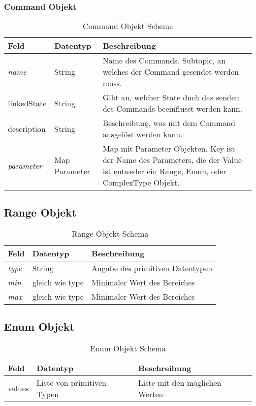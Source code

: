 \subsubsection{Command Objekt}
\begin{table}[H]
\begin{tabularx}{\textwidth}{|l|l|X|}

 \hline \rowcolor{lightgray}
 {\bf Feld } & {\bf Datentyp } & {\bf Beschreibung } \\  \hline
 
 \textit{name}  &   String   &  Name des Commands. Subtopic, an welches der Command gesendet werden muss. \\ \hline
 linkedState  &   String   &  Gibt an, welcher State duch das senden des Commands beeinflusst werden kann. \\ \hline
 description  &   String   &  Beschreibung, was mit dem Command ausgelöst werden kann.  \\ \hline
 \textit{parameter}       &   Map Parameter & Map mit Parameter Objekten. Key ist der Name des Parameters, die der Value ist entweder ein Range, Enum, oder ComplexType Objekt.\\ \hline
\end{tabularx}
\caption{Command Objekt Schema}
\end{table}




\subsection{Range Objekt}

\begin{table}[H]
\begin{tabularx}{\textwidth}{|l|l|X|}

 \hline \rowcolor{lightgray}
 {\bf Feld } & {\bf Datentyp } & {\bf Beschreibung } \\  \hline

 \textit{type}  &  String   & Angabe des primitiven Datentypen        \\ \hline
 \textit{min}   &  gleich wie type   & Minimaler Wert des Bereiches   \\ \hline
 \textit{max}   &  gleich wie type   & Minimaler Wert des Bereiches   \\ \hline

\end{tabularx}
\caption{Range Objekt Schema}
\end{table}

\subsection{Enum Objekt}

\begin{table}[H]
\begin{tabularx}{\textwidth}{|l|l|X|}

 \hline \rowcolor{lightgray}
 {\bf Feld } & {\bf Datentyp } & {\bf Beschreibung } \\  \hline

 values  &   Liste von primitiven Typen   & Liste mit den möglichen Werten   \\ \hline

\end{tabularx}
\caption{Enum Objekt Schema}
\end{table}

